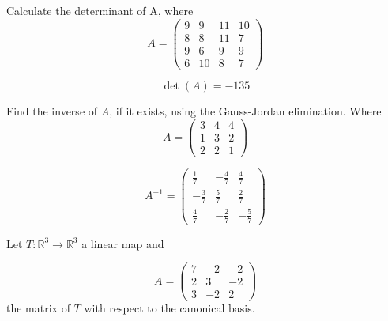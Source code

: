 \begin{questions}

\question Calculate the determinant of A, where
$$
A=\left(\begin{array}{rrrr}
9 & 9 & 11 & 10 \\
8 & 8 & 11 & 7 \\
9 & 6 & 9 & 9 \\
6 & 10 & 8 & 7
\end{array}\right)
$$

\begin{solution}
$$\det(A)=-135$$
\end{solution}

\question Find the inverse of $A$, if it exists, using the Gauss-Jordan elimination. Where
$$
A=\left(\begin{array}{rrr}
3 & 4 & 4 \\
1 & 3 & 2 \\
2 & 2 & 1
\end{array}\right)
$$

\begin{solution}
$$A^{-1}=\left(\begin{array}{rrr}
\frac{1}{7} & -\frac{4}{7} & \frac{4}{7} \\
-\frac{3}{7} & \frac{5}{7} & \frac{2}{7} \\
\frac{4}{7} & -\frac{2}{7} & -\frac{5}{7}
\end{array}\right)$$
\end{solution}

\question Let $T:\mathbb{R}^3\rightarrow\mathbb{R}^3$  a linear map and
 
$$
A=\left(\begin{array}{rrr}
7 & -2 & -2 \\
2 & 3 & -2 \\
3 & -2 & 2
\end{array}\right)
$$
the matrix of $T$ with respect to the canonical basis.
\end{questions}
